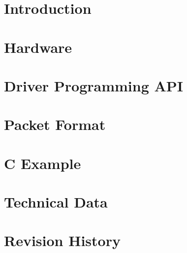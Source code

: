 \documentclass[10pt,notitlepage]{scrreprt}
\begin{document}


 \newpage 
	\newpage
	\tableofcontents
	\clearpage
	\pagestyle{fancy}
	\chapter{Introduction}
		
	\chapter{Hardware}
		
	\chapter{Driver Programming API}
		
	\chapter{Packet Format\label{cp:packetformat}}
		
	\chapter{C Example}
		
	\chapter{Technical Data}
		
		
	\chapter{Revision History}
		
		
		
\end{document}
